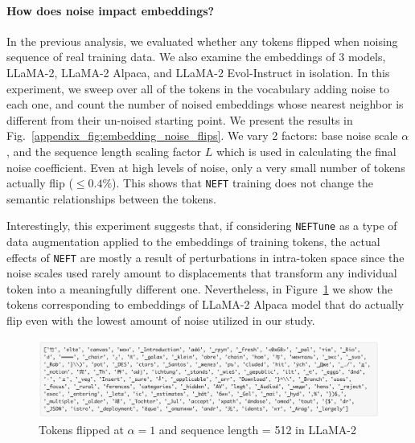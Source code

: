 \documentclass{article} %
\newcommand{\neft}{\texttt{NEFT}}
\newcommand{\neftune}{\texttt{NEFTune}}
\newcommand{\llama}{LLaMA}
\begin{document}
\paragraph{How does noise impact embeddings?}
In the previous analysis, we evaluated whether any tokens flipped when noising sequence of real training data. We also examine the embeddings of 3 models, \llama{}-2, \llama{}-2 Alpaca, and \llama{}-2 Evol-Instruct in isolation. In this experiment, we sweep over all of the tokens in the vocabulary adding noise to each one, and count the number of noised embeddings whose nearest neighbor is different from their un-noised starting point. We present the results in Fig.~\ref{appendix_fig:embedding_noise_flips}. We vary 2 factors: base noise scale $\alpha$, and the sequence length scaling factor $L$ which is used in calculating the final noise coefficient. Even at high levels of noise, only a very small number of tokens actually flip ($\leq 0.4 \%$). This shows that \neft{} training does not change the semantic relationships between the tokens. 

Interestingly, this experiment suggests that, if considering \neftune{} as a type of data augmentation applied to the embeddings of training tokens, the actual effects of \neft{} are mostly a result of perturbations in intra-token space since the noise scales used rarely amount to displacements that transform any individual token into a meaningfully different one. Nevertheless, in Figure~\ref{appendix_fig:flipped_tokens_alpaca2} we show the tokens corresponding to embeddings of \llama{}-2 Alpaca model that do actually flip even with the lowest amount of noise utilized in our study.

\begin{figure}[!h]
    \centering
     \includegraphics[width=1\linewidth,trim={0.2cm 0.2cm 0.2cm 0.2cm},clip]{figures/figs_appendix/alpaca_llama2_flipped_tokens.png}   
    \caption{Tokens flipped at $\alpha=1$ and sequence length = 512 in \llama{}-2 }
    \label{appendix_fig:flipped_tokens_alpaca2}
\end{figure}

\clearpage
\end{document}
